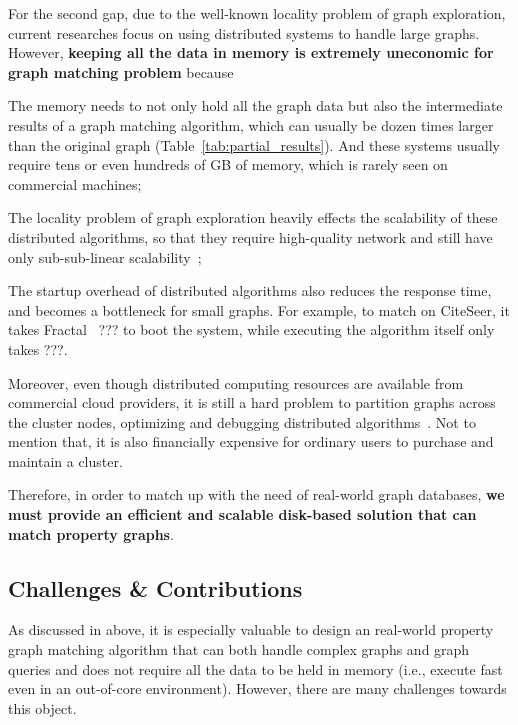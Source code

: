 For the second gap, due to the well-known locality problem of graph exploration,
current researches focus on using distributed systems to handle large graphs.
However, \textbf{keeping all the data in memory is extremely uneconomic for graph matching problem} because
\begin{enumerate*}[label={(\arabic*)}]
\item The memory needs to not only hold all the graph data but also the intermediate results of a graph matching algorithm,
  which can usually be dozen times larger than the original graph (Table~\ref{tab:partial_results}).
  And these systems usually require tens or even hundreds of GB of memory, which is rarely seen on commercial machines;
\item The locality problem of graph exploration heavily effects the scalability of these distributed algorithms,
  so that they require high-quality network and still have only sub-sub-linear scalability~\cite{DBLP:conf/sigmod/DiasTGM019};
\item The startup overhead of distributed algorithms also reduces the response time, and becomes a bottleneck for small graphs.
  For example, to match on CiteSeer, it takes Fractal~\cite{DBLP:conf/sigmod/DiasTGM019} \@??? to boot the system,
  while executing the algorithm itself only takes \@???.
\end{enumerate*}
Moreover, even though distributed computing resources are available from commercial cloud providers,
it is still a hard problem to partition graphs across the cluster nodes,
optimizing and debugging distributed algorithms~\cite{DBLP:journals/im/LeskovecLDM09,DBLP:conf/osdi/KyrolaBG12}.
Not to mention that, it is also financially expensive for ordinary users to purchase and maintain a cluster.

Therefore, in order to match up with the need of real-world graph databases,
\textbf{we must provide an efficient and scalable disk-based solution that can match property graphs}.
\subsection*{Challenges \& Contributions}
As discussed in above, it is especially valuable to design an real-world property graph matching algorithm
that can both handle complex graphs and graph queries and does not require all the data to be held in memory
(i.e., execute fast even in an out-of-core environment).
However, there are many challenges towards this object.


